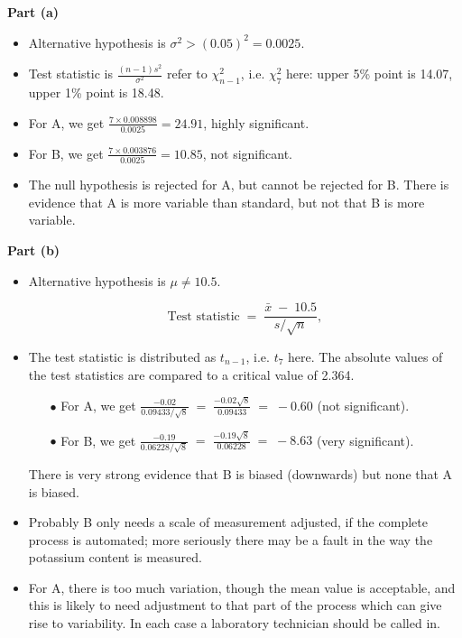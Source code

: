 \documentclass[a4paper,12pt]{article}
\begin{document}
	\large
	\noindent \textbf{Part (a)}
	\begin{itemize}
		\item Alternative hypothesis is $\sigma^2 > (0.05)^2 = 0.0025$. 
		\item 
		Test statistic is $  { \displaystyle \frac{(n - 1) s^2}{\sigma^2}  }$
		refer to  $\chi^2_{n-1}$, i.e. $\chi^2_{7}$ here: upper 5\% point is 14.07, upper 1\% point is 18.48.
		\item 
		For A, we get  $  { \displaystyle   \frac{7 \times 0.008898}{0.0025}  = 24.91 }$, highly significant. 
		\item 
		For B, we get $  { \displaystyle   \frac{7 \times 0.003876}{0.0025}  = 10.85 }$, not significant.
		\item The null hypothesis is rejected for A, but cannot be rejected for B. There is
		evidence that A is more variable than standard, but not that B is more variable.
	\end{itemize}
	
	
	\newpage
	
	\large
	\noindent \textbf{Part (b)}
	\begin{itemize}
		\item  Alternative hypothesis is $\mu \neq 10.5$.
		
		\[ \mbox{Test statistic} \;=\;  \frac{ \bar{x} \;-\;10.5 } {s / \sqrt{n}},  \]
		
		\item The test statistic is distributed as $t_{n- 1}$, i.e.
		$t_7$ here. The absolute values of the test statistics are compared to a critical value of 2.364.
		
		\begin{itemize}
			\item[$\bullet$] For A, we get $  { \displaystyle \frac{ -0.02 }{0.09433/\sqrt{8} }  \;=\; \frac{ -0.02 \sqrt{8} }{0.09433}  \;=\;   - 0.60}$ (not significant).
			\item[$\bullet$]  For B, we get $  { \displaystyle  \frac{ -0.19  }{0.06228/\sqrt{8}}  \;=\; \frac{ -0.19 \sqrt{8} }{0.06228}  \;=\;   - 8.63}$ (very significant).
		\end{itemize}
		
		There is very strong evidence that B is biased (downwards) but none that A is
		biased.
		\item  Probably B only needs a scale of measurement adjusted, if the complete
		process is automated; more seriously there may be a fault in the way the
		potassium content is measured. 
		\item For A, there is too much variation, though the
		mean value is acceptable, and this is likely to need adjustment to that part of
		the process which can give rise to variability. In each case a laboratory
		technician should be called in.
	\end{itemize}
\end{document}
